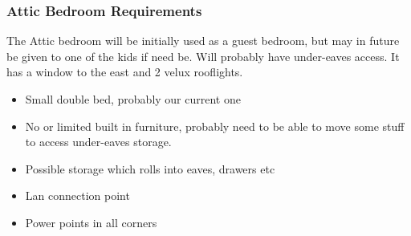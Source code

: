 \subsubsection{Attic Bedroom Requirements}
The Attic bedroom will be initially used as a guest bedroom, but may in future be given to one of the kids if need be. Will probably have under-eaves access.
It has a window to the east and 2 velux rooflights.

\begin{itemize}
\item Small double bed, probably our current one 
\item No or limited built in furniture, probably need to be able to move some stuff to access under-eaves storage.
\item Possible storage which rolls into eaves, drawers etc
\item Lan connection point
\item Power points in all corners
\end{itemize}
